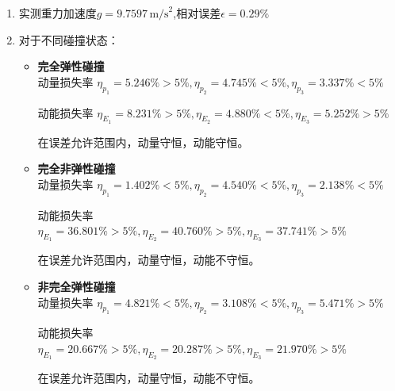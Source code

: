 \documentclass[12pt,a4paper]{article}
\begin{document}
	\begin{enumerate}
		\item  实测重力加速度$g = 9.7597 \,\text{m/s}^2$,相对误差$\epsilon = 0.29\%$

		\item  对于不同碰撞状态：
		\begin{itemize}
			\item \textbf{完全弹性碰撞}\\
				动量损失率 $\eta_{p_1}=5.246\%>5\%,\eta_{p_2}=4.745\%<5\%,\eta_{p_3}=3.337\%<5\%$

				动能损失率 $\eta_{E_1}=8.231\%>5\%,\eta_{E_2}=4.880\%<5\%,\eta_{E_3}=5.252\%>5\%$

				在误差允许范围内，动量守恒，动能守恒。
			\item \textbf{完全非弹性碰撞}\\
				动量损失率 $\eta_{p_1}=1.402\%<5\%,\eta_{p_2}=4.540\%<5\%,\eta_{p_3}=2.138\%<5\%$

				动能损失率 $\eta_{E_1}=36.801\%>5\%,\eta_{E_2}=40.760\%>5\%,\eta_{E_3}=37.741\%>5\%$

				在误差允许范围内，动量守恒，动能不守恒。
			\item \textbf{非完全弹性碰撞}\\
				动量损失率 $\eta_{p_1}=4.821\%<5\%,\eta_{p_2}=3.108\%<5\%,\eta_{p_3}=5.471\%>5\%$

				动能损失率 $\eta_{E_1}=20.667\%>5\%,\eta_{E_2}=20.287\%>5\%,\eta_{E_3}=21.970\%>5\%$

				在误差允许范围内，动量守恒，动能不守恒。

		\end{itemize}
	\end{enumerate}
\end{document}

